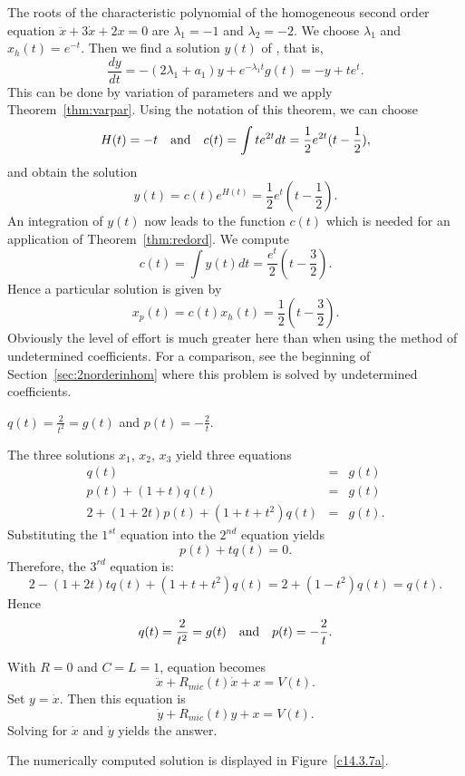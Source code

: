 \soln The roots of the characteristic polynomial of the homogeneous
second order equation $\ddot x + 3\dot x + 2x = 0$
are $\lambda_1 = -1 $ and $\lambda_2 = -2$.
We choose $\lambda_1$ and $x_h(t)=e^{-t}$.  Then we find a solution
$y(t)$ of , that is,
\[
\frac{dy}{dt} = -(2\lambda_1 +a_1) y + e^{-\lambda_1 t}g(t) =
-y + te^t.
\]
This can be done by variation of parameters and we apply
Theorem~\ref{thm:varpar}.  Using the notation of this theorem, we can
choose
\[
H(t) = -t \quad\mbox{and}\quad c(t) = \int t e^{2t} dt = \frac{1}{2}e^{2t}(t-\frac{1}{2}),
\]
and obtain the solution
\[
y(t) = c(t)e^{H(t)} = \frac{1}{2}e^{t}(t-\frac{1}{2}).
\]
An integration of $y(t)$ now leads to the function $c(t)$ which is needed
for an application of Theorem~\ref{thm:redord}.  We compute
\[
c(t) = \int y(t)dt = \frac{e^t}{2}(t-\frac{3}{2}).
\]
Hence a particular solution is given by
\[
x_p(t) = c(t) x_h(t) =  \frac{1}{2}(t-\frac{3}{2}).
\]
Obviously the level of effort is much greater here than when using the method
of undetermined coefficients.  For a comparison, see the
beginning of Section~\ref{sec:2norderinhom} where
this problem is solved by undetermined coefficients.


 \ans $q(t) = \frac{2}{t^2} = g(t)$ and  
$p(t) = -\frac{2}{t}$.

\soln  The three solutions $x_1$, $x_2$, $x_3$ yield three equations
\begin{eqnarray*}
q(t) & = & g(t)\\
p(t) +(1+t)q(t) & = & g(t)\\
2 + (1+2t)p(t) + (1+t+t^2)q(t) & = & g(t).
\end{eqnarray*}
Substituting the $1^{st}$ equation into the $2^{nd}$ equation yields
\[
p(t) + tq(t) = 0.
\]
Therefore, the $3^{rd}$ equation is:
\[
2 - (1+2t)tq(t) + (1+t+t^2)q(t) = 2 + (1-t^2)q(t) = q(t).
\]
Hence 
\[
q(t) = \frac{2}{t^2} = g(t) \quad\mbox{and}\quad  p(t) = -\frac{2}{t}.
\]

With $R=0$ and $C=L=1$, equation  becomes
\[
\ddot{x} + R_{mic}(t)\dot{x} + x = V(t).
\]
Set $y=\dot{x}$.  Then this equation is
\[
\dot{y} + R_{mic}(t)y + x = V(t).
\]
Solving for $\dot{x}$ and $\dot{y}$ yields the answer. 

 \ans The numerically computed solution is displayed in 
Figure~\ref{c14.3.7a}.

